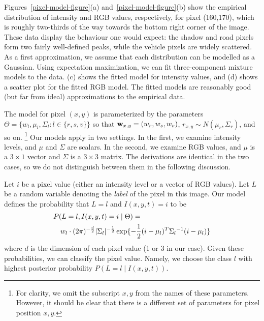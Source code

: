 Figures~\ref{pixel-model-figure}(a) and~\ref{pixel-model-figure}(b)
show the empirical distribution of intensity and RGB values,
respectively, for pixel (160,170), which is roughly two-thirds of the
way towards the bottom right corner of the image.  These data display
the behaviour one would expect: the shadow and road pixels form two
fairly well-defined peaks, while the vehicle pixels are widely
scattered.  As a first approximation, we assume that each distribution
can be modelled as a Gaussian.  Using expectation maximization, we can fit three-component mixture models to the
data. (c) shows the fitted model for
intensity values, and (d) shows a scatter
plot for the fitted RGB model. The fitted models are reasonably good
(but far from ideal) approximations to the empirical data.


The model for pixel $(x,y)$ is parameterized by the parameters $\Theta
= \{
w_l, \mu_l, \Sigma_l : l \in \{ r, s, v \}\}$ so that $\mbox{{\bf w}}_{x,y} = (w_r,
w_s, w_v )$, $r_{x,y} \sim N(\mu_r,\Sigma_r)$, and so on.%
\footnote{For clarity, we omit the subscript $x,y$ from the names of
these parameters. However, it should be clear that there is a
different set of parameters for pixel position $x,y$.}
Our models apply in two settings. In the first, we examine intensity
levels, and $\mu$ and $\Sigma$ are scalars. In the second, we examine
RGB values, and $\mu$ is a $3\times 1$ vector and $\Sigma$ is a $3\times 3$
matrix. The derivations are identical in the two cases, so we do not
distinguish between them in the following discussion.

Let $i$ be a pixel value (either an intensity level or a vector of RGB
values). Let $L$ be a random variable denoting the {\em label\/} of
the pixel in this image. Our model defines the probability that $L =
l$ and $I(x,y,t) = i$ to be
\begin{eqnarray*}
\lefteqn{P( L = l, I(x,y,t) = i \mid \Theta ) = {}} \\
 & &  w_l \cdot
(2\pi)^{-\frac{d}{2}}|\Sigma_l|^{-\frac{1}{2}} \exp\{-\frac{1}{2}(i -
\mu_l)^T {\Sigma_l}^{-1} (i - \mu_l)\}
\end{eqnarray*}
where $d$ is the dimension of each pixel value (1 or 3 in our case).
Given these probabilities, we can classify the pixel value. Namely, we
choose the class $l$ with highest posterior  probability $P( L = l \mid I(x,y,t)) $.

